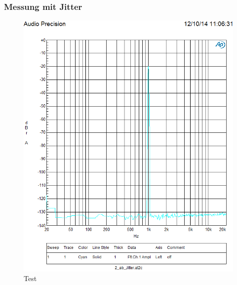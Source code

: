 \subsubsection{Messung mit Jitter}

\begin{figure}
\centering
\includegraphics[width=\columnwidth]{figures/Aufg2/off_1khz.PNG} 
\caption{Test}
\end{figure}


